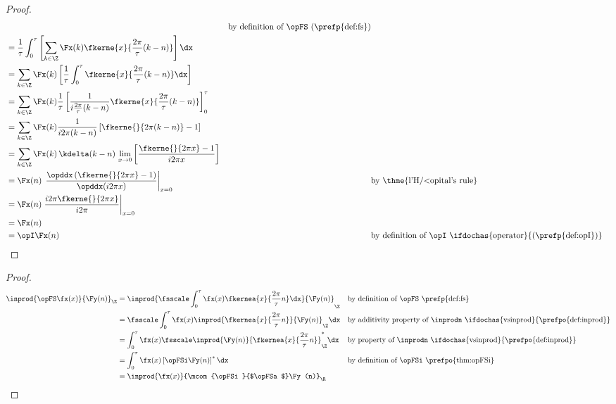 \begin{proof}
\begin{align*}
       &&    \text{by definition of $\opFS$ (\prefp{def:fs})}
     \\&=    \frac{1}{\tau} \int_0^\tau \left[ \sum_{k\in\Z} \Fx(k) \fkerne{x}{\frac{2\pi}{\tau}(k-n)}  \right]  \dx
     \\&=    \sum_{k\in\Z} \Fx(k) \left[ \frac{1}{\tau}  \int_0^\tau \fkerne{x}{\frac{2\pi}{\tau}(k-n)} \dx \right]  
     \\&=    \sum_{k\in\Z} \Fx(k) \frac{1}{\tau} \left[  \frac{1}{i\frac{2\pi}{\tau}(k-n)}  \fkerne{x}{\frac{2\pi}{\tau}(k-n)}\right]_0^\tau  
     \\&=    \sum_{k\in\Z} \Fx(k) \frac{1}{i2\pi(k-n)}\left[ \fkerne{}{2\pi(k-n)}-1  \right]  
     \\&=    \sum_{k\in\Z} \Fx(k) \, \kdelta(k-n)\, \lim_{x\to0}\left[\frac{\fkerne{}{2\pi x}-1 }{i2\pi x}\right]
     \\&=    \Fx(n) \, \left.\frac{\opddx\left(\fkerne{}{2\pi x}-1\right) }{\opddx(i2\pi x)}\right|_{x=0}
       &&    \text{by \thme{l'H{/<o}pital's rule}}
     \\&=    \Fx(n) \left.\frac{i2\pi\fkerne{}{2\pi x}}{i2\pi }\right|_{x=0}
     \\&=    \Fx(n) 
     \\&=    \opI \Fx(n)
       &&    \text{by definition of $\opI$ \ifdochas{operator}{(\prefp{def:opI})}} 
\end{align*}
\end{proof}


\begin{theorem}
\label{thm:opFSa}
\end{theorem}
\begin{proof}
\begin{align*}
  \inprod{ \opFS \fx(x) }{ \Fy(n) }_{\Z}
    &= \inprod{ \fsscale \int_0^\tau \fx(x) \fkernea{x}{\frac{2\pi}{\tau}n} \dx }{ \Fy(n) }_{\Z}
    && \text{by definition of $\opFS$ \prefp{def:fs}}
  \\&= \fsscale \int_0^\tau \fx(x) \inprod{ \fkernea{x}{\frac{2\pi}{\tau}n} }{ \Fy(n) }_{\Z}  \dx
    && \text{by additivity property of $\inprodn$ \ifdochas{vsinprod}{\prefpo{def:inprod}}}
  \\&= \int_0^\tau \fx(x) \fsscale \inprod{ \Fy(n) }{ \fkernea{x}{\frac{2\pi}{\tau}n} }_{\Z}^\ast  \dx
    && \text{by property of $\inprodn$ \ifdochas{vsinprod}{\prefpo{def:inprod}}}
  \\&= \int_0^\tau \fx(x) \left[\opFSi\Fy(n)\right]^\ast  \dx
    && \text{by definition of $\opFSi$ \prefpo{thm:opFSi}}
  \\&= \inprod{\fx(x)}{\mcom{\opFSi}{$\opFSa$}\Fy(n)}_{\R}
\end{align*}
\end{proof}



